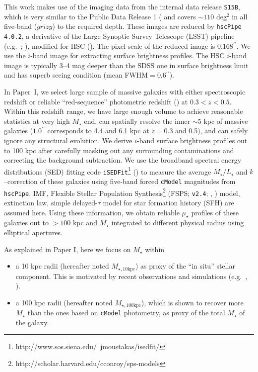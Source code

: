 \documentclass[a4paper,fleqn,usenatbib]{mnras}
\def\arcsec{{\prime\prime}}
\def\asec{$^{\prime\prime}$}
\def\cmodel{\texttt{cModel}}
\def\mstar{{$M_{\star}$}}
\def\minn{{$M_{\star,10\mathrm{kpc}}$}}
\def\mtot{{$M_{\star,100\mathrm{kpc}}$}}
\def\m2l{{$M_{\star}/L_{\star}$}}
\def\mden{{$\mu_{\star}$}}
\begin{document}
    This work makes use of the imaging data from the internal data release 
    \texttt{S15B}, which is very similar to the Public Data Release 1 
    (\citealt{HSC-DR1} and covers ${\sim} 110$ deg$^2$ in all five-band ($grizy$) to 
    the required depth. 
    These images are reduced by \texttt{hscPipe 4.0.2}, a derivative of the 
    Large Synoptic Survey Telescope (LSST) pipeline (e.g.\ \citealt{Juric2015}; 
    \citealt{Axelrod2010}), modified for HSC (\citealt{HSC-PIPE}).
    The pixel scale of the reduced image is $0.168$\asec{}.
    We use the $i$-band image for extracting surface brightness profiles.    
    The HSC $i$-band image is typically 3--4 mag deeper than the SDSS one in surface 
    brightness limit and has superb seeing condition (mean FWHM$=0.6$\asec{}).
    
    In Paper~I, we select large sample of massive galaxies with either spectroscopic 
    redshift or reliable ``red-sequence'' photometric redshift (\citealt{Rykoff2014}) 
    at $0.3<z<0.5$. 
    Within this redshift range, we have large enough volume to achieve reasonable 
    statistics at very high \mstar{} end, can spatially resolve the inner $\sim 5$ 
    kpc of massive galaxies ($1.0^{\arcsec}$ corresponds to 4.4 and 6.1 kpc at 
    $z=0.3$ and 0.5), and can safely ignore any structural evolution. 
    We derive $i$-band surface brightness profiles out to 100 kpc after carefully 
    masking out any surrounding contaminations and correcting the background 
    subtraction. 
    We use the broadband spectral energy distributions (SED) fitting code 
    \texttt{iSEDFit}\footnote{http://www.sos.siena.edu/~jmoustakas/isedfit/} 
    (\citealt{Moustakas13}) to measure the average \m2l{} and $k$--correction of 
    these galaxies using five-band forced \cmodel{} magnitudes from \texttt{hscPipe}.
    \citet{Chabrier2003} IMF, Flexible Stellar Population 
    Synthesis\footnote{http://scholar.harvard.edu/cconroy/sps-models}
    (FSPS; \texttt{v2.4}; \citealt{FSPS}, \citealt{Conroy2010}) model, 
    \citet{Calzetti2000} extinction law, simple delayed-$\tau$ model for star 
    formation history (SFH) are assumed here. 
    Using these information, we obtain reliable \mden{} profiles of these 
    galaxies out to $> 100$ kpc and \mstar{} integrated to different physical 
    radius using elliptical apertures. 
    
    As explained in Paper I, here we focus on \mstar{} within
        
    \begin{itemize}
    
        \item a 10 kpc radii (hereafter noted \minn{}) as proxy of the ``in situ'' 
            stellar component. 
            This is motivated by recent observations and simulations 
            (e.g.~\citealt{vanDokkum2010}, \citealt{RodriguezGomez2016}).  
            
        \item a 100 kpc radii (hereafter noted \mtot{}), which is shown to recover 
            more \mstar{} than the ones based on \cmodel{} photometry, as proxy of the 
            total \mstar{} of the galaxy.
            
   \end{itemize}
   
\end{document}
